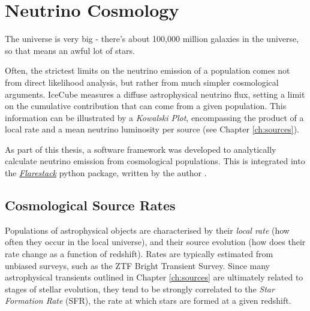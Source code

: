 \setchapterpreamble[u]{\margintoc}
\chapter{Neutrino Cosmology}
\begin{fquote}The universe is very big - there's about 100,000 million galaxies in the universe, so that means an awful lot of stars.
\end{fquote}

Often, the strictest limits on the neutrino emission of a population comes not from direct likelihood analysis, but rather from much simpler cosmological arguments. IceCube measures a diffuse astrophysical neutrino flux, setting a limit on the cumulative contribution that can come from a given population. This information can be illustrated by a \emph{Kowalski Plot}, encompassing the product of a local rate and a mean neutrino luminosity per source (see Chapter \ref{ch:sources}). 

As part of this thesis, a software framework was developed to analytically calculate neutrino emission from cosmological populations. This is integrated into the \emph{\href{https://github.com/IceCubeOpenSource/flarestack}{Flarestack}} python package, written by the author .

\section{Cosmological Source Rates}

Populations of astrophysical objects are characterised by their \emph{local rate} (how often they occur in the local universe), and their source evolution (how does their rate change as a function of redshift). Rates are typically estimated from unbiased surveys, such as the ZTF Bright Transient Survey. Since many astrophysical transients outlined in Chapter \ref{ch:sources} are ultimately related to stages of stellar evolution, they tend to be strongly correlated to the \emph{Star Formation Rate} (SFR), the rate at which stars are formed at a given redshift.


